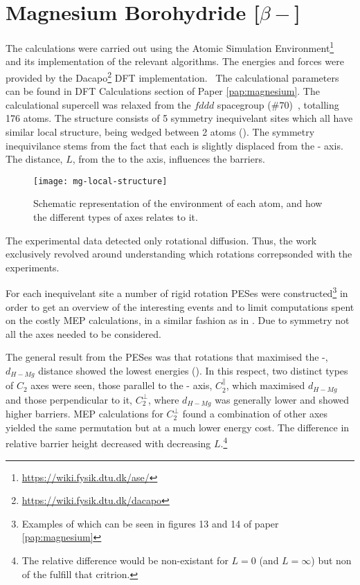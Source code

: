 \section{Magnesium Borohydride [$\beta-$]}
\label{sec:borohydrides-magnesium}

The calculations were carried out using the Atomic Simulation Environment\footnote{\url{https://wiki.fysik.dtu.dk/ase/}}~\cite{ase-2002} and its implementation of the relevant algorithms.
The energies and forces were provided by the Dacapo\footnote{\url{https://wiki.fysik.dtu.dk/dacapo}} DFT implementation.~\cite{dacapo-1999}
The calculational parameters can be found in DFT Calculations section of Paper \ref{pap:magnesium}.
The calculational supercell was relaxed from the $fddd$ spacegroup ($\#70$)~\cite{mgbh42-structure-fddd}, totalling 176 atoms.
The structure consists of 5 symmetry inequivelant  sites which all have similar local structure, being wedged between 2  atoms ().
The symmetry inequivilance stems from the fact that each  is slightly displaced from the - axis.
The distance, $L$, from the  to the axis, influences the barriers.

\begin{figure}
\begin{center}
    \texttt{[image: mg-local-structure]}
    \parbox{0.85\linewidth}{
\caption{Schematic representation of the environment of each  atom, and how the different types of axes relates to it.
}
\label{fig:mg-local-structure}
}
\end{center}
\end{figure}

The experimental data detected only rotational diffusion.
Thus, the work exclusively revolved around understanding which rotations correpsonded with the experiments.

For each inequivelant site a number of rigid rotation PESes were constructed\footnote{Examples of which can be seen in figures 13 and 14 of paper \ref{pap:magnesium}} in order to get an overview of the interesting events and to limit computations spent on the costly MEP calculations, in a similar fashion as in .
Due to symmetry not all the axes needed to be considered.

The general result from the PESes was that rotations that maximised the -, $d_{H-Mg}$ distance showed the lowest energies ().
In this respect, two distinct types of $C_2$ axes were seen, those parallel to the - axis, $C_2^\parallel$, which maximised $d_{H-Mg}$ and those perpendicular to it, $C_2^\perp$, where $d_{H-Mg}$ was generally lower and showed higher barriers.
MEP calculations for $C_2^\perp$ found a combination of other axes yielded the same permutation but at a much lower energy cost.
The difference in relative barrier height decreased with decreasing $L$.\footnote{The relative difference would be non-existant for $L=0$ (and $L=\infty$) but non of the  fulfill that critrion.}

